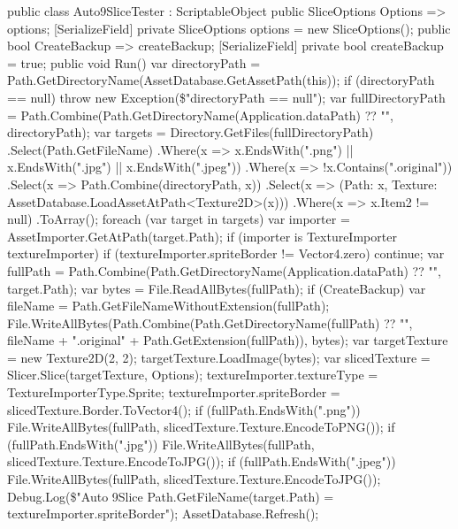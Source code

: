 \begin{mypython}[caption={Código para aplicar automáticamente el algoritmo de slice sobre los sprites deseados.},label={alg:spriteslicer}]
[CreateAssetMenu(menuName = "Auto 9Slice/Tester", fileName = nameof(Auto9SliceTester))]
public class Auto9SliceTester : ScriptableObject
{
    public SliceOptions Options => options;
    [SerializeField] private SliceOptions options = new SliceOptions();
    public bool CreateBackup => createBackup;
    [SerializeField] private bool createBackup = true;
    public void Run()
    {
        var directoryPath = Path.GetDirectoryName(AssetDatabase.GetAssetPath(this));
        if (directoryPath == null) throw new Exception(\$"directoryPath == null");
        var fullDirectoryPath = Path.Combine(Path.GetDirectoryName(Application.dataPath) ?? "", directoryPath);
        var targets = Directory.GetFiles(fullDirectoryPath)
            .Select(Path.GetFileName)
            .Where(x => x.EndsWith(".png") || x.EndsWith(".jpg") || x.EndsWith(".jpeg"))
            .Where(x => !x.Contains(".original"))
            .Select(x => Path.Combine(directoryPath, x))
            .Select(x => (Path: x, Texture: AssetDatabase.LoadAssetAtPath<Texture2D>(x)))
            .Where(x => x.Item2 != null)
            .ToArray();
        foreach (var target in targets)
        {
            var importer = AssetImporter.GetAtPath(target.Path);
            if (importer is TextureImporter textureImporter)
            {
                if (textureImporter.spriteBorder != Vector4.zero) continue;
                var fullPath = Path.Combine(Path.GetDirectoryName(Application.dataPath) ?? "", target.Path);
                var bytes = File.ReadAllBytes(fullPath);
                if (CreateBackup)
                {
                    var fileName = Path.GetFileNameWithoutExtension(fullPath);
                    File.WriteAllBytes(Path.Combine(Path.GetDirectoryName(fullPath) ?? "", fileName + ".original" + Path.GetExtension(fullPath)), bytes);
                }
                var targetTexture = new Texture2D(2, 2);
                targetTexture.LoadImage(bytes);
                var slicedTexture = Slicer.Slice(targetTexture, Options);
                textureImporter.textureType = TextureImporterType.Sprite;
                textureImporter.spriteBorder = slicedTexture.Border.ToVector4();
                if (fullPath.EndsWith(".png")) File.WriteAllBytes(fullPath, slicedTexture.Texture.EncodeToPNG());
                if (fullPath.EndsWith(".jpg")) File.WriteAllBytes(fullPath, slicedTexture.Texture.EncodeToJPG());
                if (fullPath.EndsWith(".jpeg")) File.WriteAllBytes(fullPath, slicedTexture.Texture.EncodeToJPG());
                Debug.Log(\$"Auto 9Slice {Path.GetFileName(target.Path)} = {textureImporter.spriteBorder}");
            }
        }
        AssetDatabase.Refresh();
    }
}
\end{mypython}